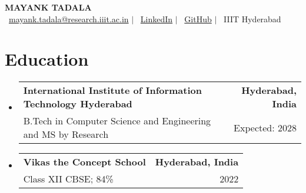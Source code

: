 \documentclass[a4paper,10pt]{article}
\makeatletter
\newcommand{\resumeSubheading}[4]{
  \vspace{-2pt}\item
    \begin{tabular*}{0.97\textwidth}[t]{l@{\extracolsep{\fill}}r}
      \textbf{#1} & \textbf{\small #2} \\
      {\small #3} & {\small #4} \\
    \end{tabular*}\vspace{-7pt}
}
\makeatother
\begin{document}
\begin{center}
    \textbf{\large MAYANK TADALA} \\
    \vspace{1mm}
    \small
    \faEnvelope\ \href{mailto:mayank.tadala@research.iiit.ac.in}{mayank.tadala@research.iiit.ac.in} $|$
    \faLinkedin\ \href{https://www.linkedin.com/in/mayank-ts-92b9031b6/}{LinkedIn} $|$
    \faGithub\ \href{https://github.com/mayank3135432}{GitHub} $|$
    \faMapMarker\ IIIT Hyderabad
\end{center}
\section{Education}
\begin{itemize}[leftmargin=0.15in, label={}]
    \resumeSubheading
        {International Institute of Information Technology Hyderabad}{Hyderabad, India}
        {B.Tech in Computer Science and Engineering and MS by Research}{Expected: 2028}
    \resumeSubheading
        {Vikas the Concept School}{Hyderabad, India}
        {Class XII CBSE; 84\%}{2022}
\end{itemize}
\end{document}
